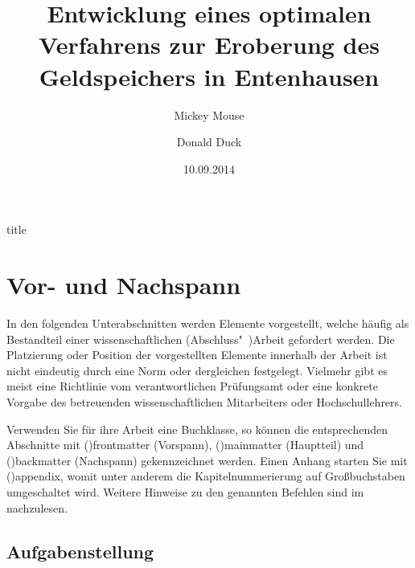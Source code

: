 \documentclass[%
  english,ngerman,%
  cdgeometry=no,DIV=12,%
  cd=false,cdfont=false,cdtitle=true,%
  headings=normal,%
  automark,%
  listof=toc,%
]{tudscrartcl}
\begin{document}
\begin{Trunk!}{title}
\title{%
  Entwicklung eines optimalen Verfahrens zur Eroberung des
  Geldspeichers in Entenhausen
}
\author{%
  Mickey Mouse%
\and%
  Donald Duck%
}
\date{10.09.2014}
\makecover
\maketitle

\end{Trunk!}



\section{Vor- und Nachspann}

In den folgenden Unterabschnitten werden Elemente vorgestellt, welche häufig 
als Bestandteil einer wissenschaftlichen (Abschluss"~)Arbeit gefordert werden. 
Die Platzierung oder Position der vorgestellten Elemente innerhalb der Arbeit 
ist nicht eindeutig durch eine Norm oder dergleichen festgelegt. Vielmehr gibt 
es meist eine Richtlinie vom verantwortlichen Prüfungsamt oder eine konkrete 
Vorgabe des betreuenden wissenschaftlichen Mitarbeiters oder Hochschullehrers.

Verwenden Sie für ihre Arbeit eine Buchklasse, so können die entsprechenden 
Abschnitte mit \Macro(){frontmatter} (Vorspann), 
\Macro(){mainmatter} (Hauptteil) und 
\Macro(){backmatter} (Nachspann) gekennzeichnet werden. 
Einen Anhang starten Sie mit \Macro(){appendix}, womit 
unter anderem die Kapitelnummerierung auf Großbuchstaben umgeschaltet wird. 
Weitere Hinweise zu den genannten Befehlen sind im \scrguide nachzulesen.



\subsection{%
  Aufgabenstellung%
  \label{sec:task}%
}
\end{document}
